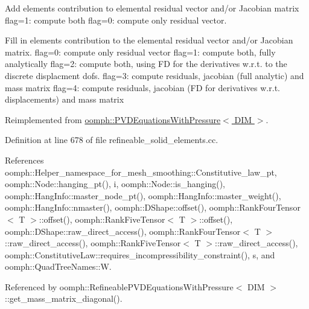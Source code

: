 Add element\textquotesingle{}s contribution to elemental residual vector and/or Jacobian matrix flag=1\+: compute both flag=0\+: compute only residual vector. 

Fill in element\textquotesingle{}s contribution to the elemental residual vector and/or Jacobian matrix. flag=0\+: compute only residual vector flag=1\+: compute both, fully analytically flag=2\+: compute both, using FD for the derivatives w.\+r.\+t. to the discrete displacment dofs. flag=3\+: compute residuals, jacobian (full analytic) and mass matrix flag=4\+: compute residuals, jacobian (FD for derivatives w.\+r.\+t. displacements) and mass matrix 

Reimplemented from \hyperlink{classoomph_1_1PVDEquationsWithPressure_a59c8c6164edf79148deb8dbeab79376d}{oomph\+::\+P\+V\+D\+Equations\+With\+Pressure$<$ D\+I\+M $>$}.



Definition at line 678 of file refineable\+\_\+solid\+\_\+elements.\+cc.



References oomph\+::\+Helper\+\_\+namespace\+\_\+for\+\_\+mesh\+\_\+smoothing\+::\+Constitutive\+\_\+law\+\_\+pt, oomph\+::\+Node\+::hanging\+\_\+pt(), i, oomph\+::\+Node\+::is\+\_\+hanging(), oomph\+::\+Hang\+Info\+::master\+\_\+node\+\_\+pt(), oomph\+::\+Hang\+Info\+::master\+\_\+weight(), oomph\+::\+Hang\+Info\+::nmaster(), oomph\+::\+D\+Shape\+::offset(), oomph\+::\+Rank\+Four\+Tensor$<$ T $>$\+::offset(), oomph\+::\+Rank\+Five\+Tensor$<$ T $>$\+::offset(), oomph\+::\+D\+Shape\+::raw\+\_\+direct\+\_\+access(), oomph\+::\+Rank\+Four\+Tensor$<$ T $>$\+::raw\+\_\+direct\+\_\+access(), oomph\+::\+Rank\+Five\+Tensor$<$ T $>$\+::raw\+\_\+direct\+\_\+access(), oomph\+::\+Constitutive\+Law\+::requires\+\_\+incompressibility\+\_\+constraint(), s, and oomph\+::\+Quad\+Tree\+Names\+::W.



Referenced by oomph\+::\+Refineable\+P\+V\+D\+Equations\+With\+Pressure$<$ D\+I\+M $>$\+::get\+\_\+mass\+\_\+matrix\+\_\+diagonal().

\mbox{\label{classoomph_1_1RefineablePVDEquationsWithPressure_aad92965f2aec749e75580d003eebdc91}} 

